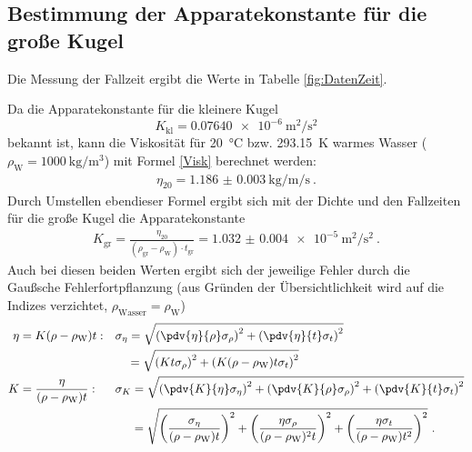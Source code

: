 \subsection{Bestimmung der Apparatekonstante für die große Kugel}
Die Messung der Fallzeit ergibt die Werte in Tabelle \ref{fig:DatenZeit}.

Da die Apparatekonstante für die kleinere Kugel
\[ K_\text{kl} = \SI{0.07640e-6}{\metre\squared\per\second\squared} \]
bekannt ist, kann die Viskosität für \SI{20}{\celsius} bzw. \SI{293.15}{\kelvin} warmes Wasser ($\rho_\text{W} = \SI{1000}{\kilo\gram\per\metre\cubed}$) mit Formel \eqref{Visk} berechnet werden:
\begin{align}
	\eta_{20} = \SI{1.186(3)}{\kilo\gram\per\metre\per\second} \ .
\end{align}
Durch Umstellen ebendieser Formel ergibt sich mit der Dichte und den Fallzeiten für die große Kugel die Apparatekonstante
\begin{align}
	K_\text{gr} = \frac{\eta_{20}}{(\rho_\text{gr}-\rho_\text{W})\cdot t_\text{gr}} = \SI{1.032(4)e-5}{\metre\squared\per\second\squared} \ .
\end{align}
Auch bei diesen beiden Werten ergibt sich der jeweilige Fehler durch die Gaußsche Fehlerfortpflanzung (aus Gründen der Übersichtlichkeit wird auf die Indizes verzichtet, $\rho_\text{Wasser}=\rho_\text{W}$)
\begin{align}
	\eta &= K(\rho-\rho_\text{W})t: && \sigma_{\eta} = \sqrt{\left(\pdv{\eta}{\rho}\sigma_{\rho}\right)^2 + \left(\pdv{\eta}{t}\sigma_{t}\right)^2} \\
	& && \quad= \sqrt{\left(Kt\sigma_\rho\right)^2+\left(K(\rho-\rho_\text{W})t\sigma_t\right)^2} \\
	K &= \frac{\eta}{(\rho-\rho_\text{W})t}: && \sigma_K = \sqrt{\left(\pdv{K}{\eta}\sigma_\eta\right)^2+\left(\pdv{K}{\rho}\sigma_\rho\right)^2+\left(\pdv{K}{t}\sigma_t\right)^2} \\
	& && \quad\ = \sqrt{\left(\frac{\sigma_\eta}{(\rho-\rho_\text{W})t}\right)^2+\left(\frac{\eta\sigma_\rho}{(\rho-\rho_\text{W})^2t}\right)^2+\left(\frac{\eta\sigma_t}{(\rho-\rho_\text{W})t^2}\right)^2} \ .
\end{align}
\clearpage

